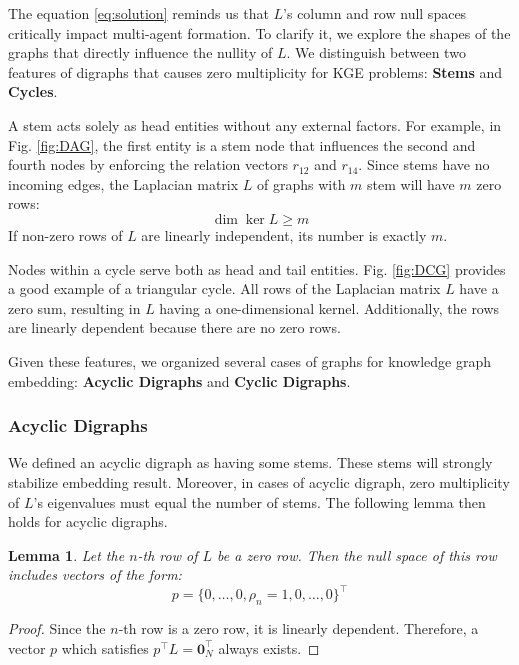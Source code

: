 \documentclass[letterpaper, 10 pt, conference]{ieeeconf}  %
\newtheorem{lemma}[theorem]{Lemma}
\begin{document}
\noindent The equation \eqref{eq:solution} reminds us that $L$'s column and row null spaces critically impact multi-agent formation. 
To clarify it, we explore the shapes of the graphs that directly influence the nullity of \( L \). We distinguish between two features of digraphs that causes zero multiplicity for KGE problems: \textbf{Stems} and \textbf{Cycles}.

A stem acts solely as head entities without any external factors. For example, in Fig. \ref{fig:DAG}, the first entity is a stem node that influences the second and fourth nodes by enforcing the relation vectors \( r_{12} \) and \( r_{14} \). Since stems have no incoming edges, the Laplacian matrix \( L \) of graphs with \( m \) stem will have \( m \) zero rows:
\[
    \dim \ker L \geq m
\]
If non-zero rows of \(L\) are linearly independent, its number is exactly \(m\). 

Nodes within a cycle serve both as head and tail entities. Fig. \ref{fig:DCG} provides a good example of a triangular cycle. All rows of the Laplacian matrix \( L \) have a zero sum, resulting in \( L \) having a one-dimensional kernel. Additionally, the rows are linearly dependent because there are no zero rows.


Given these features, we organized several cases of graphs for knowledge graph embedding: \textbf{Acyclic Digraphs} and \textbf{Cyclic Digraphs}.

\subsubsection{Acyclic Digraphs}

We defined an acyclic digraph as having some stems. These stems will strongly stabilize embedding result. Moreover, in cases of acyclic digraph, zero multiplicity of \(L\)'s eigenvalues must equal the number of stems. The following lemma then holds for acyclic digraphs.

\begin{lemma}\label{lemma:p}
Let the \( n \)-th row of \( L \) be a zero row. Then the null space of this row includes vectors of the form:
\begin{equation}\label{eq:DAG_left}
    p = \{0, \dots, 0, \rho_n = 1, 0, \dots, 0\}^\top
\end{equation}
\end{lemma}

\begin{proof}
Since the \( n \)-th row is a zero row, it is linearly dependent. Therefore, a vector \( p \) which satisfies \( p^\top L = \mathbf{0}_N^\top \) always exists.
\end{proof}
\end{document}
